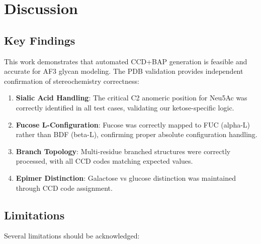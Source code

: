 
\section{Discussion}

\subsection{Key Findings}

This work demonstrates that automated CCD+BAP generation is feasible and accurate for AF3 glycan modeling. The PDB validation provides independent confirmation of stereochemistry correctness:

\begin{enumerate}
\item \textbf{Sialic Acid Handling}: The critical C2 anomeric position for Neu5Ac was correctly identified in all test cases, validating our ketose-specific logic.

\item \textbf{Fucose L-Configuration}: Fucose was correctly mapped to FUC (alpha-L) rather than BDF (beta-L), confirming proper absolute configuration handling.

\item \textbf{Branch Topology}: Multi-residue branched structures were correctly processed, with all CCD codes matching expected values.

\item \textbf{Epimer Distinction}: Galactose vs glucose distinction was maintained through CCD code assignment.
\end{enumerate}

\subsection{Limitations}

Several limitations should be acknowledged:

